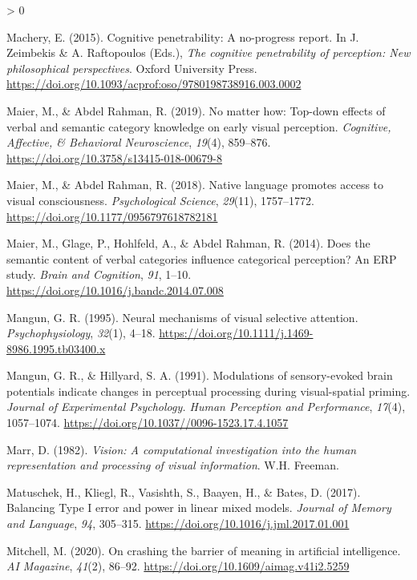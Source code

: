 \documentclass[
  english,
  doc,12pt,twoside,floatsintext]{apa7}
\newlength{\cslhangindent}
\newenvironment{CSLReferences}[2] %
 {%
  \setlength{\parindent}{0pt}
  \ifodd #1 \everypar{\setlength{\hangindent}{\cslhangindent}}\ignorespaces\fi
  \ifnum #2 > 0
  \setlength{\parskip}{#2\baselineskip}
  \fi
 }%
 {}
\begin{document}
\begin{CSLReferences}{1}{0}
\leavevmode\hypertarget{ref-machery2015}{}%
Machery, E. (2015). Cognitive penetrability: A no-progress report. In J. Zeimbekis \& A. Raftopoulos (Eds.), \emph{The cognitive penetrability of perception: New philosophical perspectives}. Oxford University Press. \url{https://doi.org/10.1093/acprof:oso/9780198738916.003.0002}

\leavevmode\hypertarget{ref-maier2019}{}%
Maier, M., \& Abdel Rahman, R. (2019). No matter how: Top-down effects of verbal and semantic category knowledge on early visual perception. \emph{Cognitive, Affective, \& Behavioral Neuroscience}, \emph{19}(4), 859--876. \url{https://doi.org/10.3758/s13415-018-00679-8}

\leavevmode\hypertarget{ref-maier2018}{}%
Maier, M., \& Abdel Rahman, R. (2018). Native language promotes access to visual consciousness. \emph{Psychological Science}, \emph{29}(11), 1757--1772. \url{https://doi.org/10.1177/0956797618782181}

\leavevmode\hypertarget{ref-maier2014}{}%
Maier, M., Glage, P., Hohlfeld, A., \& Abdel Rahman, R. (2014). Does the semantic content of verbal categories influence categorical perception? An {ERP} study. \emph{Brain and Cognition}, \emph{91}, 1--10. \url{https://doi.org/10.1016/j.bandc.2014.07.008}

\leavevmode\hypertarget{ref-mangun1995}{}%
Mangun, G. R. (1995). Neural mechanisms of visual selective attention. \emph{Psychophysiology}, \emph{32}(1), 4--18. \url{https://doi.org/10.1111/j.1469-8986.1995.tb03400.x}

\leavevmode\hypertarget{ref-mangun1991}{}%
Mangun, G. R., \& Hillyard, S. A. (1991). Modulations of sensory-evoked brain potentials indicate changes in perceptual processing during visual-spatial priming. \emph{Journal of Experimental Psychology. Human Perception and Performance}, \emph{17}(4), 1057--1074. \url{https://doi.org/10.1037//0096-1523.17.4.1057}

\leavevmode\hypertarget{ref-marr1982}{}%
Marr, D. (1982). \emph{Vision: A computational investigation into the human representation and processing of visual information}. W.H. Freeman.

\leavevmode\hypertarget{ref-matuschek2017}{}%
Matuschek, H., Kliegl, R., Vasishth, S., Baayen, H., \& Bates, D. (2017). Balancing {Type I} error and power in linear mixed models. \emph{Journal of Memory and Language}, \emph{94}, 305--315. \url{https://doi.org/10.1016/j.jml.2017.01.001}

\leavevmode\hypertarget{ref-mitchell2020}{}%
Mitchell, M. (2020). On crashing the barrier of meaning in artificial intelligence. \emph{AI Magazine}, \emph{41}(2), 86--92. \url{https://doi.org/10.1609/aimag.v41i2.5259}


\end{CSLReferences}
\end{document}
